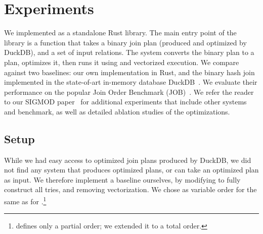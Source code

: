 \section{Experiments}\label{sec:eval}


We implemented \FJ as a standalone Rust library.  The main entry point
of the library is a function that takes a binary join plan (produced
and optimized by DuckDB), and a set of input relations.  The system
converts the binary plan to a \FJ plan, optimizes it, then runs it
using \COLT and vectorized execution.
We compare \FJ against two baselines: our own \GJ implementation in
Rust, and the binary hash join implemented in the state-of-art
in-memory database
DuckDB~\cite{DBLP:conf/cidr/RaasveldtM20,DBLP:conf/vldb/Raasveldt22}.
We evaluate their performance on the popular Join Order Benchmark
(JOB)~\cite{DBLP:journals/pvldb/LeisGMBK015}.
We refer the reader to our SIGMOD paper~\cite{10.1145/3589295}
for additional experiments that include other systems
and benchmark, as well as detailed ablation studies of the optimizations.


\subsection{Setup}

While we had easy access to optimized join plans produced by DuckDB,
we did not find any system that produces optimized \GJ plans,
or can take an optimized plan as input.
We therefore implement a \GJ baseline ourselves,
by modifying \FJ to fully construct all tries, and removing
vectorization.  We chose as variable order for \GJ the same as for
\FJ.\footnote{\FJ defines only a partial order; we extended it to a
  total order.}

